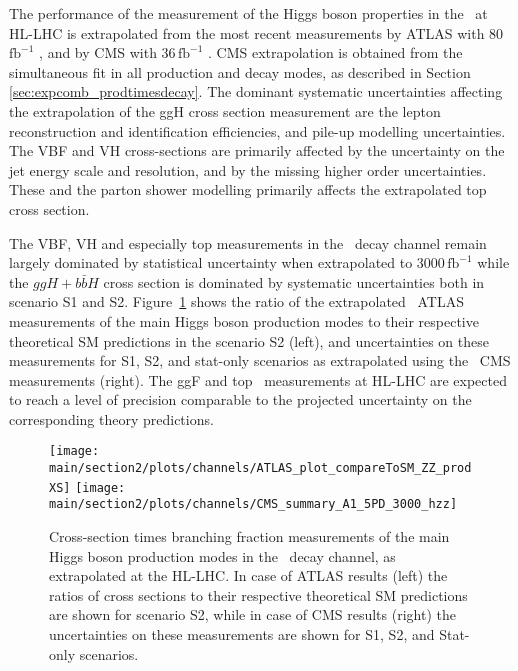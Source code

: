 The performance of the measurement of the Higgs boson properties in the \HZZ\ at HL-LHC is extrapolated from the most recent measurements by ATLAS with 80\,$\mathrm{fb}^{-1}$ \cite{ATLAS:2018bsg}, and by CMS with 36\,$\mathrm{fb}^{-1}$ \cite{Sirunyan:2017exp}.
CMS extrapolation is obtained from the simultaneous fit in all production and decay modes, as described in Section \ref{sec:expcomb_prodtimesdecay}.
The dominant systematic uncertainties affecting the extrapolation of the ggH cross section measurement are the lepton reconstruction and identification efficiencies, and pile-up modelling uncertainties. The VBF and VH cross-sections are primarily affected by the uncertainty on the jet energy scale and resolution, and by the
missing higher order uncertainties.
These and
the parton shower modelling primarily affects the extrapolated top cross section.

The VBF, VH and especially top measurements in the \HZZ\ decay channel remain largely dominated by statistical uncertainty when extrapolated to 3000\,$\mathrm{fb}^{-1}$ while the $ggH+b\bar{b}H$ cross section is dominated by systematic uncertainties both in scenario S1 and S2.
%
Figure~\ref{fig:HZZ_ATLAS_HLLHC_S2} shows the ratio of the extrapolated \HZZ\ ATLAS measurements of the main Higgs boson production modes to their respective theoretical SM predictions in the scenario S2 (left), and uncertainties on these measurements for S1, S2, and stat-only scenarios as extrapolated using the \HZZ\ CMS measurements (right). The ggF and top \HZZ\ measurements at HL-LHC are expected to reach a level of precision comparable to the projected uncertainty on the corresponding theory predictions.

\begin{figure}
  \centering
  \texttt{[image: \\main/section2/plots/channels/ATLAS\_plot\_compareToSM\_ZZ\_prodXS]}
  \texttt{[image: \\main/section2/plots/channels/CMS\_summary\_A1\_5PD\_3000\_hzz]}
  \caption{Cross-section times branching fraction measurements of the main Higgs boson production modes in the \HZZ\ decay channel, as extrapolated at the HL-LHC. In case of ATLAS results (left) the ratios of cross sections to their respective theoretical SM predictions are shown for scenario S2, while in case of CMS results (right) the uncertainties on these measurements are shown for S1, S2, and Stat-only scenarios.}
  \label{fig:HZZ_ATLAS_HLLHC_S2}
\end{figure}

